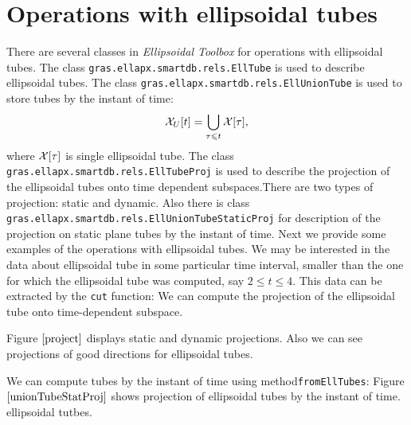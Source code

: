\section{Operations with ellipsoidal tubes}
There are several classes in {\it Ellipsoidal Toolbox} for operations with ellipsoidal tubes. The class {\tt gras.ellapx.smartdb.rels.EllTube} is used
to describe ellipsoidal tubes. The class {\tt gras.ellapx.smartdb.rels.EllUnionTube} is used to store tubes by the instant of time:
$$
\XX_{U}[t]=\bigcup \limits_{\tau\leq t}\XX[\tau],
$$
where $\XX[\tau]$ is single ellipsoidal tube.
\newline
The class {\tt gras.ellapx.smartdb.rels.EllTubeProj} is used to describe the projection of the ellipsoidal tubes onto time dependent subspaces.There are two types of projection: static and dynamic.
Also there is class {\tt gras.ellapx.smartdb.rels.EllUnionTubeStaticProj} for description of the projection on static plane tubes by the instant of time.
\newline
Next we provide some examples of the operations with ellipsoidal tubes.
We may be interested in the data about ellipsoidal tube in some
particular time interval, smaller than the one for which the ellipsoidal tube was
computed, say $2\leq t\leq4$.
This data can be extracted  by the {\tt cut} function:
We can compute the projection of the ellipsoidal tube onto time-dependent subspace.

Figure $\ref{project}$ displays static and dynamic projections. Also we can see projections of good directions for
ellipsoidal tubes.

We can compute tubes by the instant of time using method{\tt fromEllTubes}:
Figure $\ref{unionTubeStatProj}$ shows projection of ellipsoidal tubes by the instant of time.
ellipsoidal tutbes.

